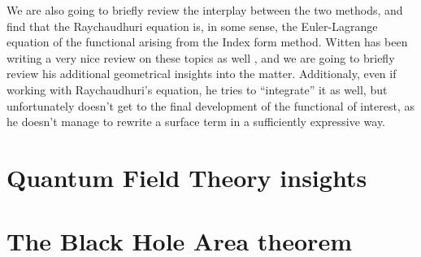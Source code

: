 We are also going to briefly review the interplay between the two methods, and find that the Raychaudhuri equation is, in some sense, the Euler-Lagrange equation of the functional arising from the Index form method. Witten has been writing a very nice review on these topics as well \cite[]{witten2020light}, and we are going to briefly review his additional geometrical insights into the matter. Additionaly, even if working with Raychaudhuri's equation, he tries to ``integrate'' it as well, but unfortunately doesn't get to the final development of the functional of interest, as he doesn't manage to rewrite a surface term in a sufficiently expressive way.

\section{Quantum Field Theory insights}

\section{The Black Hole Area theorem}

